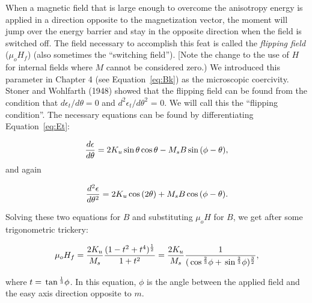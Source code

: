 When a  magnetic field  that is large enough to overcome the anisotropy energy is applied in a direction opposite to the magnetization vector, the moment will jump over the energy barrier and stay in the opposite direction when the field is switched off.  The field necessary to accomplish this feat is called the 
{\it flipping field}  ($\mu_oH_f$)  (also sometimes the ``switching field'').    [Note the change to the use of $H$ for internal fields where $M$ cannot be considered  zero.)   \nocite{stoner48}   We introduced this parameter in Chapter 4 (see Equation~\ref{eq:Bk}) as the microscopic coercivity.   
Stoner and Wohlfarth (1948)  showed that the flipping field can be found from the condition that $d\epsilon_t/d\theta = 0$ and $d^2\epsilon_t/d\theta^2$ = 0.  We will call this the 
``flipping condition''.   The necessary equations can be found by differentiating Equation~\ref{eq:Et}:

\begin{equation}
{d\epsilon \over {d\theta}} = 2 K_u \sin \theta \cos \theta - M_s B \sin (\phi - \theta),
\label{eq:1stderiv}
\end{equation}
\noindent
and again

\begin{equation}
{d^2 \epsilon\over {d\theta^2}} = 2 K_u \cos (2\theta) + M_s B \cos (\phi - \theta ).
\label{eq:2ndderiv}
\end{equation}

\noindent Solving these two equations for $B$ and substituting $\mu_oH$ for $B$,  we get after some trigonometric trickery:

\begin{equation}
\mu_o H_f = { {2K_u \over {M_s} } 
{  {(1-t^2 + t^4)^{1\over 2} } \over {1 + t^2} } }=   {2K_u \over {M_s} }
{ 1 \over { (\cos ^{2\over 3}  \phi + \sin ^{2\over 3} \phi)^{3\over 2} }},
\label{eq:Bf}
\end{equation}

\noindent where $t= \tan^{1\over 3} \phi$.  In this equation, $\phi$ is the angle between the applied field and the easy axis direction opposite to $m$.    

